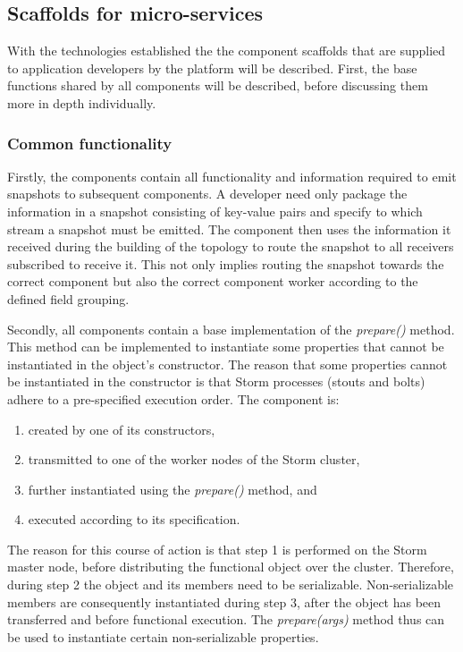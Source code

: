 \subsection{Scaffolds for micro-services}
With the technologies established the the component scaffolds that are supplied to application developers by the platform will be described. First, the base functions shared by all components will be described, before discussing them more in depth individually.

\subsubsection*{Common functionality}
Firstly, the components contain all functionality and information required to emit snapshots to subsequent components. A developer need only package the information in a snapshot consisting of key-value pairs and specify to which stream a snapshot must be emitted. The component then uses the information it received during the building of the topology to route the snapshot to all receivers subscribed to receive it. This not only implies routing the snapshot towards the correct component but also the correct component worker according to the defined field grouping.

Secondly, all components contain a base implementation of the \emph{prepare()} method. This method can be implemented to instantiate some properties that cannot be instantiated in the object's constructor. The reason that some properties cannot be instantiated in the constructor is that Storm processes (stouts and bolts) adhere to a pre-specified execution order. The component is:
\begin{enumerate}
\nospace
\item created by one of its constructors,
\item transmitted to one of the worker nodes of the Storm cluster,
\item further instantiated using the \emph{prepare()} method, and
\item executed according to its specification.
\end{enumerate}
The reason for this course of action is that step 1 is performed on the Storm master node, before distributing the functional object over the cluster. Therefore, during step 2 the object and its members need to be serializable. Non-serializable members are consequently instantiated during step 3, after the object has been transferred and before functional execution. The \emph{prepare(args)} method thus can be used to instantiate certain non-serializable properties. 

